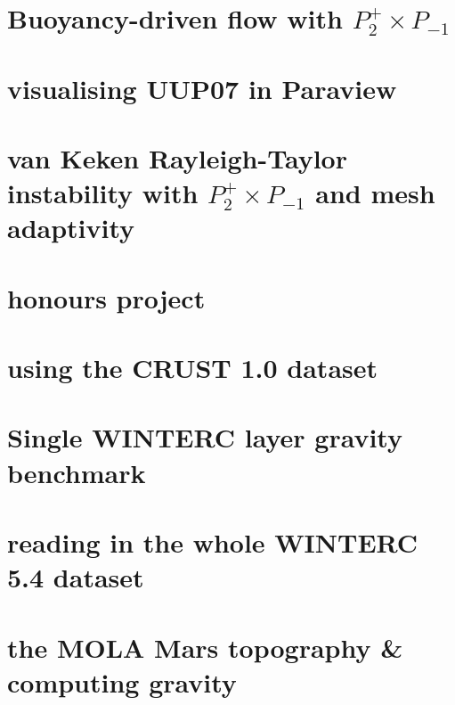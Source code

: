 \documentclass[a4paper,11pt]{report}
\begin{document}
\chapter{Buoyancy-driven flow with $P_2^+\times P_{-1}$ \label{f93}}

\chapter{visualising UUP07 in Paraview \label{f94}}

\chapter{van Keken \etal Rayleigh-Taylor instability with $P_2^+\times P_{-1}$ and mesh adaptivity \label{f95}}

\chapter{honours project \label{f96}}

\chapter{using the CRUST 1.0 dataset \label{f97}}

\chapter{Single WINTERC layer gravity benchmark \label{f98}}

\chapter{reading in the whole WINTERC 5.4 dataset \label{f99}}

\chapter{the MOLA Mars topography \& computing gravity \label{f100}}
\end{document}

